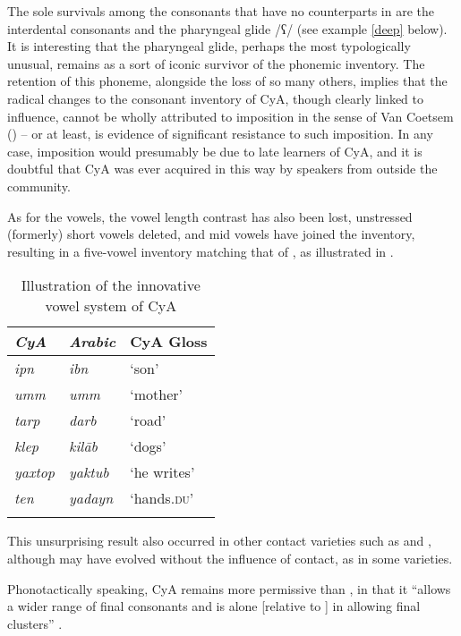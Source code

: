 \documentclass[output=paper]{langsci/langscibook}
\begin{document}
The sole survivals among the  consonants that have no counterparts in  are the interdental consonants and the {pharyngeal} glide /ʕ/ (see example \ref{deep} below). It is interesting that the {pharyngeal} glide, perhaps the most typologically unusual, remains as a sort of iconic survivor of the  phonemic inventory. The retention of this {phoneme}, alongside the loss of so many others, implies that the radical changes to the consonant inventory of CyA, though clearly linked to  influence, cannot be wholly attributed to {imposition} in the sense of Van Coetsem (\citeyear{VanCoetsem1988,VanCoetsem2000}) – or at least, is evidence of significant resistance to such {imposition}. In any case, {imposition} would presumably be due to late learners of CyA, and it is doubtful that CyA was ever acquired in this way by speakers from outside the community.

As for the vowels, the  {vowel length} contrast has also been lost, unstressed (formerly) short vowels deleted, and mid vowels have joined the inventory, resulting in a five-vowel inventory matching that of , as illustrated in .

\begin{table}
\begin{tabular}{>{\itshape}l>{\itshape}ll}
\lsptoprule
{\normalfont CyA} & {\normalfont Arabic} & {CyA Gloss}\\\midrule
ipn & ibn & ‘son’\\
umm & umm & ‘mother’\\
tarp & darb & ‘road’\\
klep & kilāb & ‘dogs’\\
yaxtop & yaktub & ‘he writes’\\
ten & yadayn & ‘hands\textsc{.du}’\\
\lspbottomrule
\end{tabular}
\caption{\label{bkm:Ref13775635}Illustration of the innovative vowel system of CyA\label{tab:walter:2}}
\end{table}


This unsurprising result also occurred in other contact varieties such as  and  , although may have evolved without the influence of contact, as in some  varieties.


Phonotactically speaking, CyA remains more permissive than , in that it “allows a wider range of final consonants and is alone [{relative} to ] in allowing final clusters” \citep[51]{Newton1964}.
\end{document}
